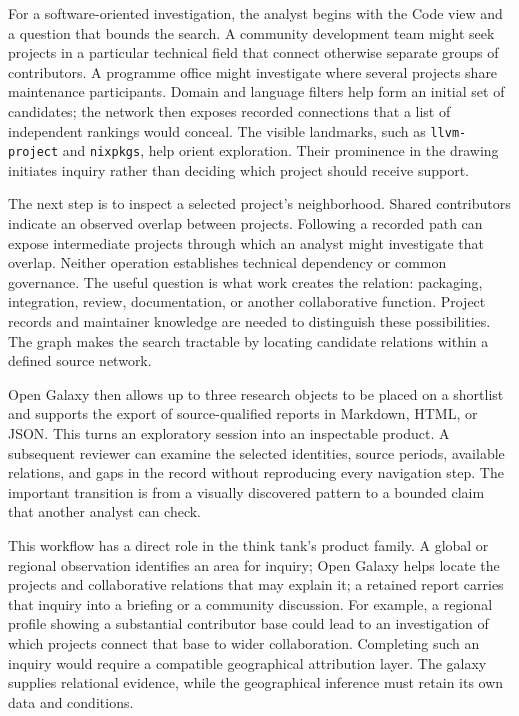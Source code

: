 For a software-oriented investigation, the analyst begins with the Code view and a question that bounds the search. A community development team might seek projects in a particular technical field that connect otherwise separate groups of contributors. A programme office might investigate where several projects share maintenance participants. Domain and language filters help form an initial set of candidates; the network then exposes recorded connections that a list of independent rankings would conceal. The visible landmarks, such as \texttt{llvm-project} and \texttt{nixpkgs}, help orient exploration. Their prominence in the drawing initiates inquiry rather than deciding which project should receive support.

The next step is to inspect a selected project's neighborhood. Shared contributors indicate an observed overlap between projects. Following a recorded path can expose intermediate projects through which an analyst might investigate that overlap. Neither operation establishes technical dependency or common governance. The useful question is what work creates the relation: packaging, integration, review, documentation, or another collaborative function. Project records and maintainer knowledge are needed to distinguish these possibilities. The graph makes the search tractable by locating candidate relations within a defined source network.

Open Galaxy then allows up to three research objects to be placed on a shortlist and supports the export of source-qualified reports in Markdown, HTML, or JSON. This turns an exploratory session into an inspectable product. A subsequent reviewer can examine the selected identities, source periods, available relations, and gaps in the record without reproducing every navigation step. The important transition is from a visually discovered pattern to a bounded claim that another analyst can check.

This workflow has a direct role in the think tank's product family. A global or regional observation identifies an area for inquiry; Open Galaxy helps locate the projects and collaborative relations that may explain it; a retained report carries that inquiry into a briefing or a community discussion. For example, a regional profile showing a substantial contributor base could lead to an investigation of which projects connect that base to wider collaboration. Completing such an inquiry would require a compatible geographical attribution layer. The galaxy supplies relational evidence, while the geographical inference must retain its own data and conditions.

